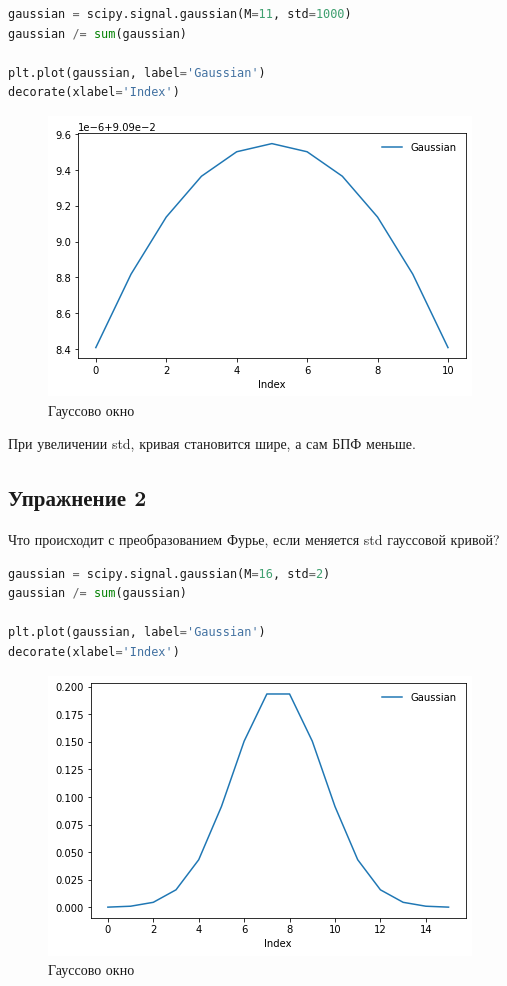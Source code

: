 \begin{lstlisting}[language=Python]
gaussian = scipy.signal.gaussian(M=11, std=1000)
gaussian /= sum(gaussian)

plt.plot(gaussian, label='Gaussian')
decorate(xlabel='Index')
\end{lstlisting}
\begin{figure}[H]
	\begin{center}
		\includegraphics[scale=0.7]{fig/lab08/lab08_7_0.png}
		\caption{Гауссово окно}
	\end{center}
\end{figure}

При увеличении std, кривая становится шире, а сам БПФ меньше.

\subsection{Упражнение 2}

Что происходит с преобразованием Фурье, если меняется std гауссовой кривой?

\begin{lstlisting}[language=Python]
gaussian = scipy.signal.gaussian(M=16, std=2)
gaussian /= sum(gaussian)

plt.plot(gaussian, label='Gaussian')
decorate(xlabel='Index')
\end{lstlisting}
\begin{figure}[H]
	\begin{center}
		\includegraphics[scale=0.7]{fig/lab08/lab08_10_0.png}
		\caption{Гауссово окно}
	\end{center}
\end{figure}

